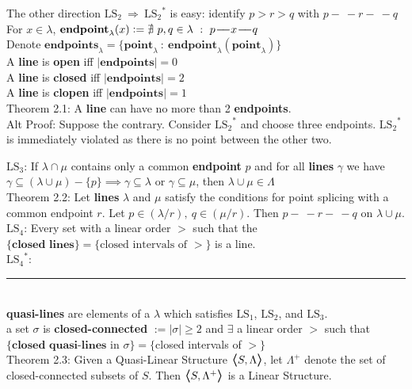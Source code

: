\documentclass{article}
\newcommand{\hsp}[1][5]{\hspace{0.#1 cm}}
\newcommand{\hcm}[1][1]{\hspace{#1 cm}}
\newcommand{\bra}[1][1.2]{\scalebox{#1}{$\boldsymbol{\langle}$}}
\newcommand{\nl}[1][12]{\\[#1pt]}
\newcommand{\ket}[1][1.2]{\scalebox{#1}{$\boldsymbol{\rangle}$}}
\newcommand{\imp}{\ \Rightarrow\ }
\newcommand{\st}{\ : \ }
\newcommand{\defeq}{\vcentcolon=}
\newcommand{\ch}[1]{\text{#1}}
\newcommand {\chb}[1]{\textbf{#1}}
\newcommand{\seg}{\!-\!\!\!\!\:-}
\begin{document}
\begin{flushleft}
\hcm The other direction $\ch{LS}_2 \imp {\ch{LS}_2}^*$ is easy: identify $p>r>q$ with $p\seg r\seg q$\nl[12]

\hsp[2] For $x \in \lambda$, $\chb{endpoint}_\lambda(x) \defeq \nexists\ p,q \in \lambda \st p\seg x \seg q$\\
\hsp[2] Denote $\chb{endpoints}_\lambda = \{\chb{point}_\lambda \st \chb{endpoint}_\lambda(\chb{point}_\lambda)\}$\\[6pt]\hsp[2]
A \chb{line} is \chb{open} iff $|\chb{endpoints}|=0$\\\hsp[2]
A \chb{line} is \chb{closed} iff $|\chb{endpoints}|=2$\\\hsp[2]
A \chb{line} is \chb{clopen} iff $|\chb{endpoints}|=1$\nl\hsp[2]
Theorem 2.1: A \chb{line} can have no more than 2 \chb{endpoints}.\\\hcm
{\color{purple}
	Alt Proof: Suppose the contrary. Consider ${\ch{LS}_2}^*$ and choose three endpoints. ${\ch{LS}_2}^*$ is immediately violated as there is no point between the other two.\nl[10]
}

$\ch{LS}_3$: If $\lambda \cap \mu$ contains only a common \chb{endpoint} $p$ and for all \chb{lines} $\gamma$ we have {\color{purple} $\gamma \subseteq (\lambda \cup \mu) - \{p\} \implies \gamma \subseteq \lambda$ or $\gamma \subseteq \mu$}, then $\lambda \cup \mu \in \Lambda$\nl[10]

\hsp[2] Theorem 2.2: Let \chb{lines} $\lambda$ and $\mu$ satisfy the conditions for point splicing with a common endpoint $r$. Let $p \in (\lambda/r),\ q\in (\mu/r)$. Then $p\seg r \seg q$ on $\lambda\cup \mu$.\nl[10]

$\ch{LS}_4$: Every set with a linear order $>$ such that the $\{\chb{closed lines}\} = \{\ch{closed intervals of }>\}$ is a line.\nl[5]

{\color{purple}
	${\ch{LS}_4}^*$:\nl[10]
}

\par\noindent\rule{\textwidth}{0.4pt}\nl[5] %

\chb{quasi-lines} are elements of a $\lambda$ which satisfies $\ch{LS}_1$, $\ch{LS}_2$, and $\ch{LS}_3$.\nl[2]
\hsp[2] a set $\sigma$ is \chb{closed-connected} $ := |\sigma| \geq 2 $ and $\exists$ a linear order $>$ such that \\\hcm$\{\chb{closed quasi-lines}$ in $\sigma\} = \{$closed intervals of $>\}$\nl[10]

\hcm Theorem 2.3: Given a Quasi-Linear Structure $\bra S, \Lambda\ket$, let $\Lambda^+$ denote the set of closed-connected subsets of $S$. Then $\bra S, \Lambda^+\ket $ is a Linear Structure.\nl[20]


\end{flushleft}
\end{document}
